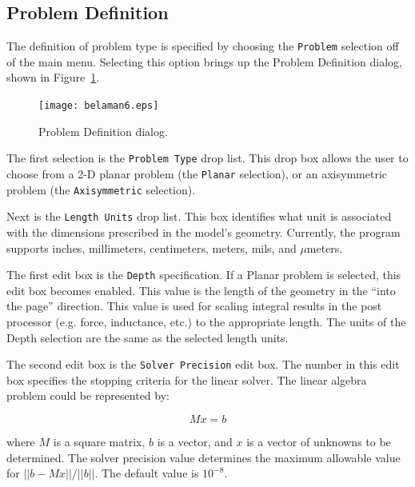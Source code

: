 \documentclass[12pt]{report}
\begin{document}
\subsection{Problem Definition}

The definition of problem type is specified by choosing the
\texttt{Problem} selection off of the main menu. Selecting this
option brings up the Problem Definition dialog, shown in
Figure~\ref{fig6}.

\begin{figure}[htbp]
\centerline{\texttt{[image: belaman6.eps]}}
\caption{Problem Definition dialog.}
\label{fig6}
\end{figure}

The first selection is the \texttt{Problem Type} drop list. This
drop box allows the user to choose from a 2-D planar problem (the
\texttt{Planar} selection), or an axisymmetric problem (the
\texttt{Axisymmetric} selection).





Next is the \texttt{Length Units} drop list. This box identifies
what unit is associated with the dimensions prescribed in the
model's geometry. Currently, the program supports inches,
millimeters, centimeters, meters, mils, and $\mu $meters.





The first edit box is the \texttt{Depth} specification. If a Planar
problem is selected, this edit box becomes enabled. This value is
the length of the geometry in the ``into the page'' direction. This
value is used for scaling integral results in the post processor
(e.g. force, inductance, etc.) to the appropriate length. The units
of the Depth selection are the same as the selected length units.

The second edit box is the \texttt{Solver Precision} edit box. The
number in this edit box specifies the stopping criteria for the
linear solver. The linear algebra problem could be represented by:

\begin{equation}
M x = b
\end{equation}

\noindent
where $M$ is a square matrix, $b$ is a vector, and $x$ is a vector of
unknowns to be determined. The solver precision value determines the maximum
allowable value for $\vert \vert b - Mx\vert \vert / \vert \vert b\vert
\vert $. The default value is $10^{ - 8}$.
\end{document}
